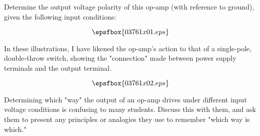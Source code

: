 

Determine the output voltage polarity of this op-amp (with reference to ground), given the following input conditions:

$$\epsfbox{03761x01.eps}$$







In these illustrations, I have likened the op-amp's action to that of a single-pole, double-throw switch, showing the "connection" made between power supply terminals and the output terminal.

$$\epsfbox{03761x02.eps}$$







Determining which "way" the output of an op-amp drives under different input voltage conditions is confusing to many students.  Discuss this with them, and ask them to present any principles or analogies they use to remember "which way is which."




